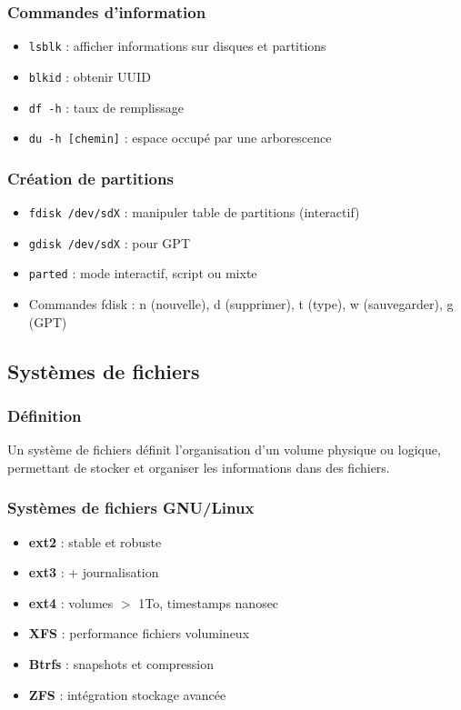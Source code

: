 \documentclass[12pt,a4paper]{article}
\begin{document}
\subsubsection{Commandes d'information}
\begin{itemize}
    \item \texttt{lsblk} : afficher informations sur disques et partitions
    \item \texttt{blkid} : obtenir UUID
    \item \texttt{df -h} : taux de remplissage
    \item \texttt{du -h [chemin]} : espace occup\'e par une arborescence
\end{itemize}

\subsubsection{Cr\'eation de partitions}
\begin{itemize}
    \item \texttt{fdisk /dev/sdX} : manipuler table de partitions (interactif)
    \item \texttt{gdisk /dev/sdX} : pour GPT
    \item \texttt{parted} : mode interactif, script ou mixte
    \item Commandes fdisk : n (nouvelle), d (supprimer), t (type), w (sauvegarder), g (GPT)
\end{itemize}

\subsection{Syst\`emes de fichiers}

\subsubsection{D\'efinition}
Un syst\`eme de fichiers d\'efinit l'organisation d'un volume physique ou logique, permettant de stocker et organiser les informations dans des fichiers.

\subsubsection{Syst\`emes de fichiers GNU/Linux}
\begin{itemize}
    \item \textbf{ext2} : stable et robuste
    \item \textbf{ext3} : + journalisation
    \item \textbf{ext4} : volumes $>$ 1To, timestamps nanosec
    \item \textbf{XFS} : performance fichiers volumineux
    \item \textbf{Btrfs} : snapshots et compression
    \item \textbf{ZFS} : int\'egration stockage avanc\'ee
\end{itemize}
\end{document}

